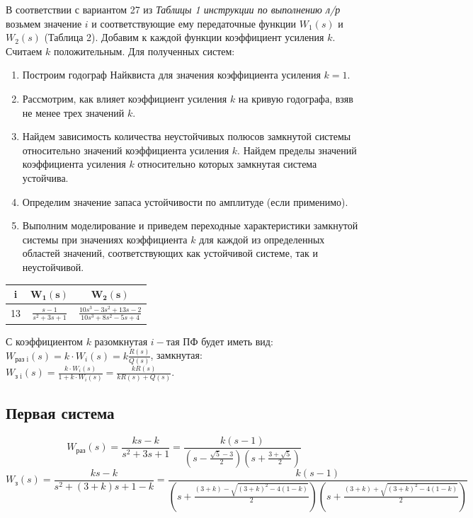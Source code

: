 В соответствии с вариантом 27 из \textit{Таблицы 1 инструкции по выполнению л/р} возьмем значение $i$ и соответствующие ему передаточные функции $W_1(s)$ и $W_2(s)$ (Таблица 2). Добавим к каждой
функции коэффициент усиления $k$. Считаем $k$ положительным. Для полученных систем:
\begin{enumerate}
    \item Построим годограф Найквиста для значения коэффициента усиления $k = 1$.
    \item Рассмотрим, как влияет коэффициент усиления $k$ на кривую годографа, взяв не
    менее трех значений $k$.
    \item Найдем зависимость количества неустойчивых полюсов замкнутой системы относительно значений коэффициента усиления $k$. Найдем пределы значений коэффициента усиления $k$ относительно которых замкнутая система устойчива.
    \item Определим значение запаса устойчивости по амплитуде (если применимо).
    \item Выполним моделирование и приведем переходные характеристики замкнутой системы при значениях коэффициента $k$ для каждой из определенных областей значений, соответствующих как устойчивой системе, так и неустойчивой.
\end{enumerate}

\begin{table}[h]
\centering
\begin{tabular}{|c|c|c|}
\hline
\textbf{i} & $\mathbf{W_1(s)}$ & $\mathbf{W_2(s)}$ \\ \hline
13 & $\displaystyle \frac{s-1}{s^2+3s+1}$ & $\displaystyle \frac{10s^3-3s^2+13s-2}{10s^3+8s^2-5s+4}$ \\ \hline
\end{tabular}
\end{table}

С коэффициентом $k$ разомкнутая $i-$тая ПФ будет иметь вид: $W_\text{раз i}(s)=k\cdot W_i(s)=k\frac{R(s)}{Q(s)}$, замкнутая:  
$W_\text{з i}(s)=\frac{k\cdot W_i(s)}{1+k\cdot W_i(s)}=\frac{kR(s)}{kR(s)+Q(s)}$.\\

\subsection{Первая система}
$$W_\text{раз}(s)=\frac{ks-k}{s^2+3s+1}=
\frac{k(s-1)}{\left(s-\frac{\sqrt{5}-3}{2}\right)\left(s+\frac{3+\sqrt{5}}{2}\right)}$$
$$W_\text{з}(s)=\frac{ks-k}{s^2+(3+k)s+1-k}=
\frac{k(s-1)}{\left(s+\frac{(3+k)-\sqrt{(3+k)^2-4(1-k)}}{2}\right)\left(s+\frac{(3+k)+\sqrt{(3+k)^2-4(1-k)}}{2}\right)}$$

